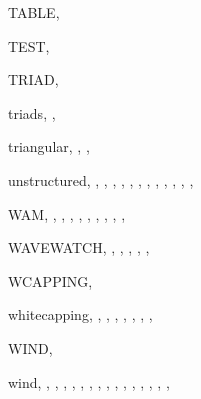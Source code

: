 \documentclass[12pt]{book}
\begin{document}
\begin{theindex}
  \indexspace

  \item TABLE, 
  \item TEST, 
  \item TRIAD, 
  \item triads, , 
  \item triangular, , , 

  \indexspace

  \item unstructured, , , 
		, , , 
		, , , 
		, , , 
		, 

  \indexspace

  \item WAM, , , , 
		, , , 
		, , , 
  \item WAVEWATCH, , , , 
		, , 
  \item WCAPPING, 
  \item whitecapping, , , , 
		, , , 
		, 
  \item WIND, 
  \item wind, , , , 
		, , , 
		, , , 
		, , , 
		, , , 

\end{theindex}
\end{document}
